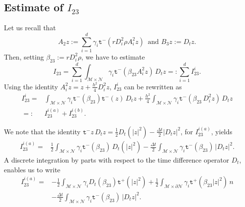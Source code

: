 \documentclass[11pt,oneside,leqno]{amsart}
\numberwithin{equation}{section}
\numberwithin{equation}{section}
\newcommand{\trp}{\mathtt t^+}
\newcommand{\trm}{\mathtt t^-}
\begin{document}
\subsection{Estimate of $I_{23}$}
Let us recall that
\begin{equation*}
    A_{2}z:=\sum_{i=1}^{d}\gamma_{i}\trm(rD_{i}^{2}\rho A_{i}^{2}z)\, \text{ and }B_{3}z:=D_{t}z.
\end{equation*}
Then, setting $\beta_{23}:=rD_{i}^{2}\rho$, we have to estimate
\begin{equation}
I_{23}=\sum_{i=1}^{d}\int_{\mathcal{M}\times\mathcal{N}}\gamma_{i}\trm(\beta_{23}A_{i}^{2}z)\,D_{t}z=:\sum_{i=1}^{d}I^{i}_{23}.
\end{equation}
Using the identity $A_{i}^{2}z=z+\frac{h^{2}}{4}D_{i}^{2}z$, $I^{i}_{23}$ can be rewritten as
\begin{equation}
\begin{split}
    I^{i}_{23}=&\int_{\mathcal{M}\times\mathcal{N}}\gamma_{i}\trm(\beta_{23})\trm(z)\,D_{t}z+\frac{h^{2}}{4}\int_{\mathcal{M}\times\mathcal{N}}\gamma_{i}\trm(\beta_{23}\,D_{i}^{2}z)\,D_{t}z\\
    =:&I_{23}^{i(a)}+I_{23}^{i(b)}.
    \end{split}
    \end{equation}
\par We note that the identity $\trm z\,D_{t}z=\frac{1}{2}D_{t}(|z|^{2})-\frac{\Delta t}{2}|D_{t}z|^{2}$, for $I_{23}^{i(a)}$, yields 
\begin{equation*}
\begin{split}
    I_{23}^{i(a)}=&\frac{1}{2}\int_{\mathcal{M}\times\mathcal{N}}\gamma_{i}\trm(\beta_{23})\,D_{t}(|z|^{2})-\frac{\Delta t}{2}\int_{\mathcal{M}\times\mathcal{N}}\gamma_{i}\trm(\beta_{23})\,|D_{t}z|^{2}.
    \end{split}
    \end{equation*}
A discrete integration by parts with respect to the time difference operator $D_{t}$, \cite[Equation (2.9) ]{LMPZ:2023} enables us to write
\begin{equation*}
\begin{split}
    I_{23}^{i(a)}=&-\frac{1}{2}\int_{\mathcal{M}\times\mathcal{N}}\gamma_{i}D_{t}(\beta_{23})\trp(|z|^{2})+\frac{1}{2}\int_{\mathcal{M}\times\partial\mathcal{N}}\gamma_{i}\trp(\beta_{23}|z|^{2})\,n\\
    &-\frac{\Delta t}{2}\int_{\mathcal{M}\times\mathcal{N}}\gamma_{i}\trm(\beta_{23})\,|D_{t}z|^{2}.
\end{split}
\end{equation*}
\end{document}
